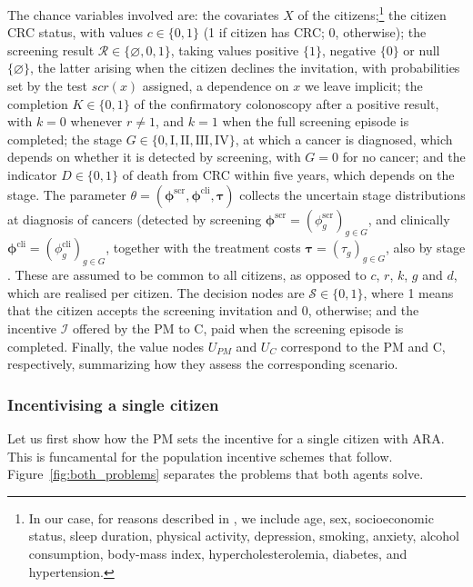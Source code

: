\documentclass[12pt]{article}
\begin{document}
The chance variables involved are: the covariates $X$ of the citizens;\footnote{In our case, for reasons described in \cite{corrales2024colorectal}, we include age, sex, socioeconomic status, sleep duration, physical activity, depression, smoking, anxiety, alcohol consumption, body-mass index, hypercholesterolemia, diabetes, and hypertension.} the citizen CRC status, with values $c \in \{0,1\}$ (1 if citizen has CRC; 0, otherwise); the screening result $\mathcal{R} \in \{\varnothing, 0, 1\}$, taking values positive $\{1\}$, negative $\{0\}$ or null $\{\varnothing\}$, the latter arising when the citizen declines the invitation, with probabilities set by the test $scr(x)$ assigned, a dependence on $x$ we leave implicit; the completion $K \in \{0, 1\}$ of the confirmatory colonoscopy after a positive result, with $k = 0$ whenever $r \neq 1$, and $k=1$ when the full screening episode is completed; the stage $G \in \{0, \text{I}, \text{II}, \text{III}, \text{IV}\}$, at which a cancer is diagnosed, which depends on whether it is detected by screening, with $G=0$ for no cancer; and the indicator $D \in \{0,1\}$ of death from CRC within five years, which depends on the stage. The parameter $\theta = (\boldsymbol{\phi}^{\text{scr}}, \boldsymbol{\phi}^{\text{cli}}, \boldsymbol{\tau})$ collects the uncertain stage distributions at diagnosis of cancers (detected by screening $\boldsymbol{\phi}^{\text{scr}} = (\phi_g^{\text{scr}})_{g \in G}$, and clinically $\boldsymbol{\phi}^{\text{cli}} = (\phi_g^{\text{cli}})_{g\in G}$, together with the treatment costs $\boldsymbol{\tau} = (\tau_{g})_{g \in G}$, also by stage . These are assumed to be common to all citizens, as opposed to $c$, $r$, $k$, $g$ and $d$, which are realised per citizen.  The decision nodes are $\mathcal{S} \in \{0,1\}$, where 1 means that the citizen accepts the screening invitation and 0, otherwise; and the incentive $\mathcal{I}$ offered by the PM to C, paid when the screening episode is completed. Finally, the value nodes $U_{PM}$ and $U_C$ correspond to the PM and C, respectively, summarizing how they assess the corresponding scenario.



\subsubsection{Incentivising a single citizen}\label{sec:single_patient}
Let us first show how the PM sets the incentive for a single citizen with ARA. This is funcamental for the population incentive schemes that follow. Figure~\ref{fig:both_problems} separates the problems that both agents solve.
\end{document}
